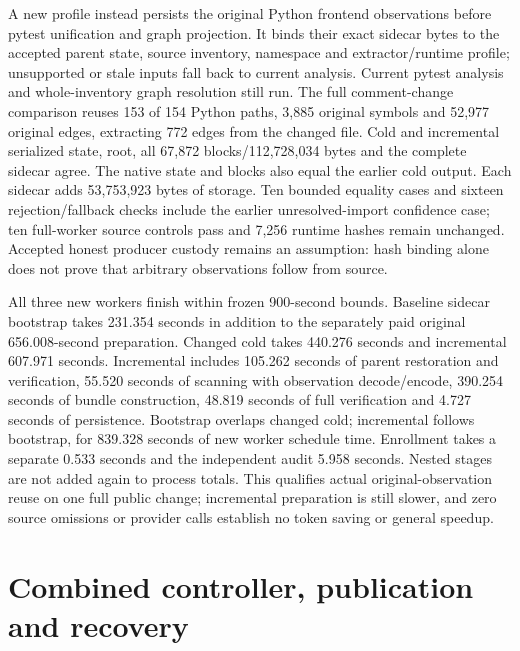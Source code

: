 A new profile instead persists the original Python frontend observations before
pytest unification and graph projection. It binds their exact sidecar bytes to
the accepted parent state, source inventory, namespace and extractor/runtime
profile; unsupported or stale inputs fall back to current analysis. Current
pytest analysis and whole-inventory graph resolution still run. The full
comment-change comparison reuses 153 of 154 Python paths, 3,885 original symbols
and 52,977 original edges, extracting 772 edges from the changed file. Cold and
incremental serialized state, root, all 67,872 blocks/112,728,034 bytes and the
complete sidecar agree. The native state and blocks also equal the earlier cold
output. Each sidecar adds 53,753,923 bytes of storage. Ten bounded equality
cases and sixteen rejection/fallback checks include the earlier unresolved-import
confidence case; ten full-worker source controls pass and 7,256 runtime hashes
remain unchanged. Accepted honest producer custody remains an assumption:
hash binding alone does not prove that arbitrary observations follow from source.

All three new workers finish within frozen 900-second bounds. Baseline sidecar
bootstrap takes 231.354 seconds in addition to the separately paid original
656.008-second preparation. Changed cold takes 440.276 seconds and incremental
607.971 seconds. Incremental includes 105.262 seconds of parent restoration and
verification, 55.520 seconds of scanning with observation decode/encode,
390.254 seconds of bundle construction, 48.819 seconds of full verification and
4.727 seconds of persistence. Bootstrap overlaps changed cold; incremental
follows bootstrap, for 839.328 seconds of new worker schedule time. Enrollment
takes a separate 0.533 seconds and the independent audit 5.958 seconds.
Nested stages are not added again to process totals. This qualifies actual
original-observation reuse on one full public change; incremental preparation
is still slower, and zero source omissions or provider calls establish no
token saving or general speedup.


\section{Combined controller, publication and recovery}
\label{sec:incremental-controller-publication}
